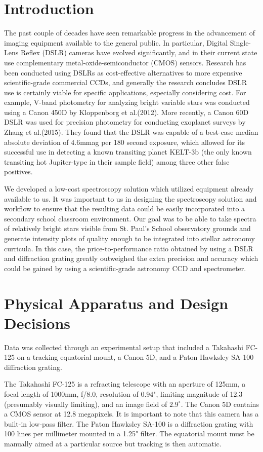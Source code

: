 \documentclass[prb,preprint]{revtex4-1}
\begin{document}
\section{Introduction}
	The past couple of decades have seen remarkable progress in the advancement of imaging equipment available to the general public. In particular, Digital Single-Lens Reflex (DSLR) cameras have evolved significantly, and in their current state use complementary metal-oxide-semiconductor (CMOS) sensors. Research has been conducted using DSLRs as cost-effective alternatives to more expensive scientific-grade commercial CCDs, and generally the research concludes DSLR use is certainly viable for specific applications, especially considering cost. For example, V-band photometry for analyzing bright variable stars was conducted using a Canon 450D by Kloppenborg et al.\@(2012).\cite{vbpdslr} More recently, a Canon 60D DSLR was used for precision photometry for conducting exoplanet surveys by Zhang et al.\@(2015).\cite{mbpdslr} They found that the DSLR was capable of a best-case median absolute deviation of 4.6mmag per 180 second exposure, which allowed for its successful use in detecting a known transiting planet KELT-3b (the only known transiting hot Jupiter-type in their sample field) among three other false positives.

	We developed a low-cost spectroscopy solution which utilized equipment already available to us. It was important to us in designing the spectroscopy solution and workflow to ensure that the resulting data could be easily incorporated into a secondary school classroom environment. Our goal was to be able to take spectra of relatively bright stars visible from St. Paul's School observatory grounds and generate intensity plots of quality enough to be integrated into stellar astronomy curricula. In this case, the price-to-performance ratio obtained by using a DSLR and diffraction grating greatly outweighed the extra precision and accuracy which could be gained by using a scientific-grade astronomy CCD and spectrometer.

\section{Physical Apparatus and Design Decisions}
	Data was collected through an experimental setup that included a Takahashi FC-125 on a tracking equatorial mount, a Canon 5D, and a Paton Hawksley SA-100 diffraction grating.

	The Takahashi FC-125 is a refracting telescope with an aperture of 125mm, a focal length of 1000mm, f/8.0, resolution of 0.94", limiting magnitude of 12.3 (presumably visually limiting), and an image field of $2.9^{\circ}$.\cite{fc125spec} The Canon 5D contains a CMOS sensor at 12.8 megapixels. It is important to note that this camera has a built-in low-pass filter.\cite{5dspec} The Paton Hawksley SA-100 is a diffraction grating with 100 lines per millimeter mounted in a 1.25" filter. The equatorial mount must be manually aimed at a particular source but tracking is then automatic.
\end{document}
